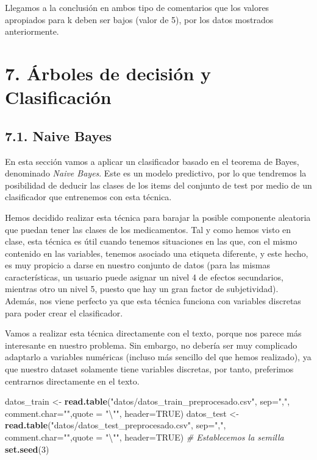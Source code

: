 \documentclass[spanish,]{article}
\newenvironment{Shaded}{\begin{snugshade}}{\end{snugshade}}
\newcommand{\KeywordTok}[1]{\textcolor[rgb]{0.13,0.29,0.53}{\textbf{#1}}}
\newcommand{\DataTypeTok}[1]{\textcolor[rgb]{0.13,0.29,0.53}{#1}}
\newcommand{\DecValTok}[1]{\textcolor[rgb]{0.00,0.00,0.81}{#1}}
\newcommand{\CharTok}[1]{\textcolor[rgb]{0.31,0.60,0.02}{#1}}
\newcommand{\StringTok}[1]{\textcolor[rgb]{0.31,0.60,0.02}{#1}}
\newcommand{\CommentTok}[1]{\textcolor[rgb]{0.56,0.35,0.01}{\textit{#1}}}
\newcommand{\OtherTok}[1]{\textcolor[rgb]{0.56,0.35,0.01}{#1}}
\newcommand{\NormalTok}[1]{#1}
\begin{document}
Llegamos a la conclusión en ambos tipo de comentarios que los valores
apropiados para k deben ser bajos (valor de 5), por los datos mostrados
anteriormente.

\newpage

\section{7. Árboles de decisión y
Clasificación}\label{arboles-de-decision-y-clasificacion}

\subsection{7.1. Naive Bayes}\label{naive-bayes}

En esta sección vamos a aplicar un clasificador basado en el teorema de
Bayes, denominado \emph{Naive Bayes}. Este es un modelo predictivo, por
lo que tendremos la posibilidad de deducir las clases de los items del
conjunto de test por medio de un clasificador que entrenemos con esta
técnica.

Hemos decidido realizar esta técnica para barajar la posible componente
aleatoria que puedan tener las clases de los medicamentos. Tal y como
hemos visto en clase, esta técnica es útil cuando tenemos situaciones en
las que, con el mismo contenido en las variables, tenemos asociado una
etiqueta diferente, y este hecho, es muy propicio a darse en nuestro
conjunto de datos (para las mismas características, un usuario puede
asignar un nivel 4 de efectos secundarios, mientras otro un nivel 5,
puesto que hay un gran factor de subjetividad). Además, nos viene
perfecto ya que esta técnica funciona con variables discretas para poder
crear el clasificador.

Vamos a realizar esta técnica directamente con el texto, porque nos
parece más interesante en nuestro problema. Sin embargo, no debería ser
muy complicado adaptarlo a variables numéricas (incluso más sencillo del
que hemos realizado), ya que nuestro dataset solamente tiene variables
discretas, por tanto, preferimos centrarnos directamente en el texto.

\begin{Shaded}
\begin{Highlighting}[]
\NormalTok{datos_train <-}\StringTok{ }\KeywordTok{read.table}\NormalTok{(}\StringTok{"datos/datos_train_preprocesado.csv"}\NormalTok{, }\DataTypeTok{sep=}\StringTok{","}\NormalTok{,}
                          \DataTypeTok{comment.char=}\StringTok{""}\NormalTok{,}\DataTypeTok{quote =} \StringTok{"}\CharTok{\textbackslash{}"}\StringTok{"}\NormalTok{, }\DataTypeTok{header=}\OtherTok{TRUE}\NormalTok{)}
\NormalTok{datos_test <-}\StringTok{ }\KeywordTok{read.table}\NormalTok{(}\StringTok{"datos/datos_test_preprocesado.csv"}\NormalTok{, }\DataTypeTok{sep=}\StringTok{","}\NormalTok{,}
                         \DataTypeTok{comment.char=}\StringTok{""}\NormalTok{,}\DataTypeTok{quote =} \StringTok{"}\CharTok{\textbackslash{}"}\StringTok{"}\NormalTok{, }\DataTypeTok{header=}\OtherTok{TRUE}\NormalTok{)}
\CommentTok{# Establecemos la semilla}
\KeywordTok{set.seed}\NormalTok{(}\DecValTok{3}\NormalTok{)}
\end{Highlighting}
\end{Shaded}
\end{document}
